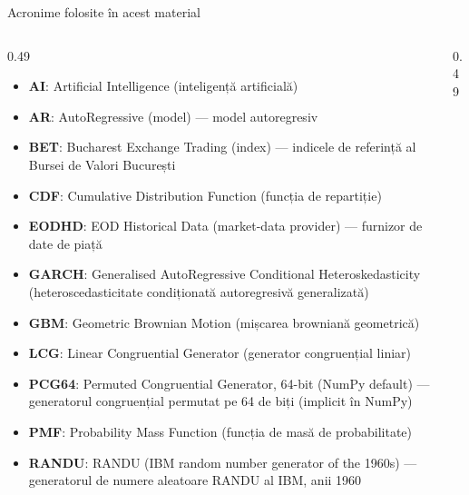 {
\begin{frame}[noframenumbering]
    \titlepage
\end{frame}
}
\begin{frame}{Acronime folosite în acest material}
\begin{columns}[T]
\begin{column}{0.49\textwidth}
\begin{itemize}\setlength{\itemsep}{0pt}
    \item \textbf{AI}: Artificial Intelligence (inteligență artificială)
    \item \textbf{AR}: AutoRegressive (model) — model autoregresiv
    \item \textbf{BET}: Bucharest Exchange Trading (index) — indicele de referință al Bursei de Valori București
    \item \textbf{CDF}: Cumulative Distribution Function (funcția de repartiție)
    \item \textbf{EODHD}: EOD Historical Data (market-data provider) — furnizor de date de piață
    \item \textbf{GARCH}: Generalised AutoRegressive Conditional Heteroskedasticity (heteroscedasticitate condiționată autoregresivă generalizată)
    \item \textbf{GBM}: Geometric Brownian Motion (mișcarea browniană geometrică)
    \item \textbf{LCG}: Linear Congruential Generator (generator congruențial liniar)
    \item \textbf{PCG64}: Permuted Congruential Generator, 64-bit (NumPy default) — generatorul congruențial permutat pe 64 de biți (implicit în NumPy)
    \item \textbf{PMF}: Probability Mass Function (funcția de masă de probabilitate)
    \item \textbf{RANDU}: RANDU (IBM random number generator of the 1960s) — generatorul de numere aleatoare RANDU al IBM, anii 1960
\end{itemize}
\end{column}
\begin{column}{0.49\textwidth}
\end{column}
\end{columns}
\end{frame}

